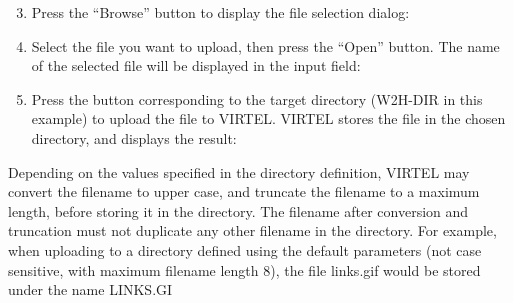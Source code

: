 \documentclass[letterpaper,10pt,english]{sphinxmanual}
\begin{document}

\begin{enumerate}
\setcounter{enumi}{2}
\item {} 
Press the “Browse” button to display the file selection dialog:

\end{enumerate}


\begin{enumerate}
\setcounter{enumi}{3}
\item {} 
Select the file you want to upload, then press the “Open” button. The name of the selected file will be displayed in the input field:

\end{enumerate}


\begin{enumerate}
\setcounter{enumi}{4}
\item {} 
Press the button corresponding to the target directory (W2H-DIR in this example) to upload the file to VIRTEL. VIRTEL stores the file in the chosen directory, and displays the result:

\end{enumerate}



Depending on the values specified in the directory definition, VIRTEL may convert the filename to upper case, and truncate the filename to a maximum length, before storing it in the directory. The filename after conversion and truncation must not duplicate any other filename in the directory. For example, when uploading to a directory defined using the default parameters (not case sensitive, with maximum filename length 8), the file links.gif would be stored under the name LINKS.GI

\newpage

\end{document}
